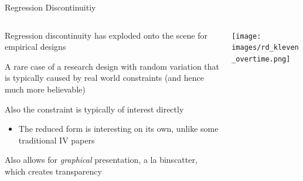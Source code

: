 \documentclass[notes,11pt, aspectratio=169]{beamer}
\newenvironment{wideitemize}{\itemize\addtolength{\itemsep}{10pt}}{\enditemize}
\begin{document}
\begin{frame}{Regression Discontinuitiy}
    \begin{columns}[onlytextwidth, T] %
      \begin{column}{.5\textwidth}
        \begin{wideitemize}
        \item Regression discontinuity has exploded onto the scene for empirical designs
        \item A rare case of a research design with random variation
          that is typically caused by real world constraints (and
          hence much more believable)
        \item Also the constraint is typically of interest directly
          \begin{itemize}
          \item The reduced form is interesting on its own, unlike
            some traditional IV papers
          \end{itemize}
        \item Also allows for \emph{graphical} presentation, a la
          binscatter, which creates transparency
        \end{wideitemize}
      \end{column}%
      \hfill%
      \begin{column}{.5\textwidth}
        \texttt{[image: images/rd\_kleven\_overtime.png]}
      \end{column}%
    \end{columns}
\end{frame}
\end{document}
